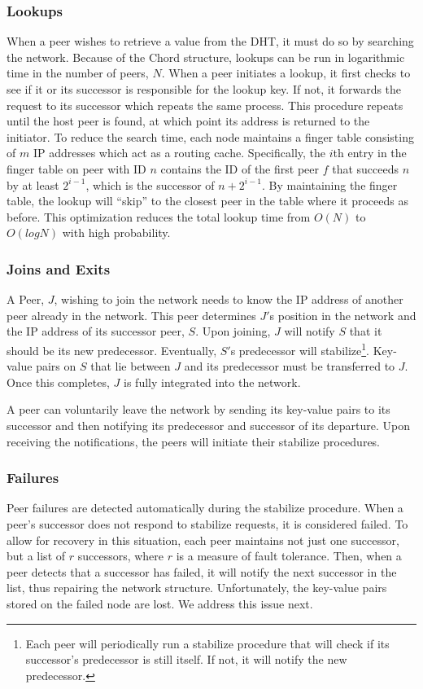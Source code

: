 \documentclass[twocolumn]{article}
\begin{document}
\subsubsection{Lookups}
When a peer wishes to retrieve a value from the DHT, it must do so by searching the network. Because of the Chord structure, lookups can be run in logarithmic time in the number of peers, $N$. When a peer initiates a lookup, it first checks to see if it or its successor is responsible for the lookup key. If not, it forwards the request to its successor which repeats the same process. This procedure repeats until the host peer is found, at which point its address is returned to the initiator. To reduce the search time, each node maintains a finger table consisting of $m$ IP addresses which act as a routing cache. Specifically, the $i$th entry in the finger table on peer with ID $n$ contains the ID of the first peer $f$ that succeeds $n$ by at least $2^{i-1}$, which is the successor of $n+2^{i-1}$. By maintaining the finger table, the lookup will \enquote{skip} to the closest peer in the table where it proceeds as before. This optimization reduces the total lookup time from $O(N)$ to $O(log⁡{N})$ with high probability.

\subsubsection{Joins and Exits}
A Peer, $J$, wishing to join the network needs to know the IP address of another peer already in the network. This peer determines $J'$s position in the network and the IP address of its successor peer, $S$. Upon joining, $J$ will notify $S$ that it should be its new predecessor. Eventually, $S'$s predecessor will stabilize\footnote{Each peer will periodically run a stabilize procedure that will check if its successor's predecessor is still itself. If not, it will notify the new predecessor.}. Key-value pairs on $S$ that lie between $J$ and its predecessor must be transferred to $J$. Once this completes, $J$ is fully integrated into the network.

A peer can voluntarily leave the network by sending its key-value pairs to its successor and then notifying its predecessor and successor of its departure. Upon receiving the notifications, the peers will initiate their stabilize procedures.

\subsubsection{Failures}
Peer failures are detected automatically during the stabilize procedure. When a peer's successor does not respond to stabilize requests, it is considered failed. To allow for recovery in this situation, each peer maintains not just one successor, but a list of $r$ successors, where $r$ is a measure of fault tolerance. Then, when a peer detects that a successor has failed, it will notify the next successor in the list, thus repairing the network structure. Unfortunately, the key-value pairs stored on the failed node are lost. We address this issue next.
\end{document}
